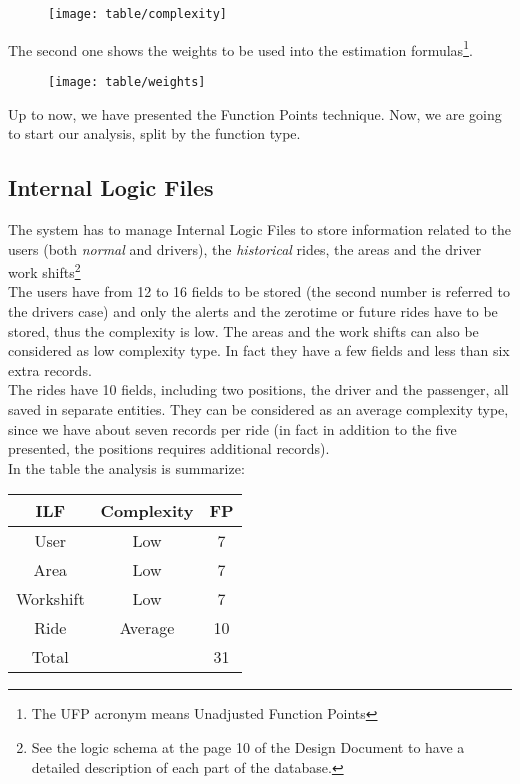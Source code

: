 \documentclass[\mainpath/main]{subfiles}
\begin{document}
\begin{figure} [!ht]
	\centering
	\texttt{[image: table/complexity]}
\end{figure}

The second one shows the weights to be used into the estimation formulas\footnote{The UFP acronym means Unadjusted Function Points}.

\begin{figure}[!ht]
	\centering
	\texttt{[image: table/weights]}
\end{figure}

\clearpage

Up to now, we have presented the Function Points technique. Now, we are going to start our analysis, split by the function type.

\subsection{Internal Logic Files}
The system has to manage Internal Logic Files to store information related to the users (both \textit{normal} and drivers), the \textit{historical} rides, the areas and the driver work shifts\footnote{See the logic schema at the page 10 of the Design Document to have a detailed description of each part of the database.}\\
The users have from 12 to 16 fields to be stored (the second number is referred to the drivers case) and only the alerts and the zerotime or future rides have to be stored, thus the complexity is low. The areas and the work shifts can also be considered as low complexity type. In fact they have a few fields and less than six extra records.\\
The rides have 10 fields, including two positions, the driver and the passenger, all saved in separate entities. They can be considered as an average complexity type, since we have about seven records per ride (in fact in addition to the five presented, the positions requires additional records).\\
In the table the analysis is summarize:
\begin{tabular}{ccc}
	\hline ILF & Complexity & FP \\
	\hline User & Low & 7 \\
				Area & Low & 7 \\
				Workshift & Low & 7 \\
				Ride & Average & 10 \\
	\hline Total & & 31
\end{tabular}
\end{document}
